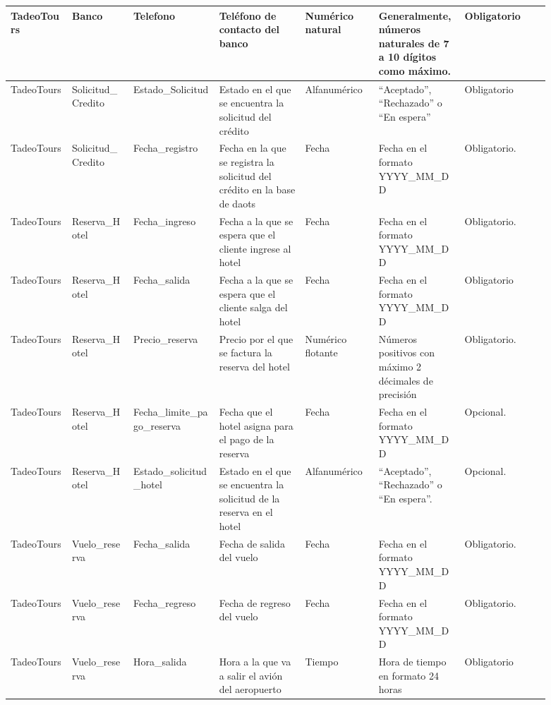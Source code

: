 \documentclass{article}
\begin{document}
\begin{landscape}
\begin{longtable}{|C{0.102\linewidth}|C{0.102\linewidth}|C{0.142\linewidth}|C{0.142\linewidth}|C{0.122\linewidth}|C{0.142\linewidth}|C{0.142\linewidth}|}
TadeoTours & Banco & Telefono & Teléfono de contacto del banco & Numérico natural & Generalmente, números naturales de 7 a 10 dígitos como máximo. & Obligatorio \\ \hline

TadeoTours & Solicitud\_Credito & Estado\_Solicitud & Estado en el que se encuentra la solicitud del crédito & Alfanumérico & ``Aceptado'', ``Rechazado'' o ``En espera'' & Obligatorio \\ \hline

TadeoTours & Solicitud\_Credito & Fecha\_registro & Fecha en la que se registra la solicitud del crédito en la base de daots & Fecha & Fecha en el formato YYYY\_MM\_DD & Obligatorio. \\ \hline

TadeoTours & Reserva\_Hotel & Fecha\_ingreso & Fecha a la que se espera que el cliente ingrese al hotel & Fecha & Fecha en el formato YYYY\_MM\_DD & Obligatorio. \\ \hline

TadeoTours & Reserva\_Hotel & Fecha\_salida & Fecha a la que se espera que el cliente salga del hotel & Fecha & Fecha en el formato YYYY\_MM\_DD & Obligatorio \\ \hline

TadeoTours & Reserva\_Hotel & Precio\_reserva & Precio por el que se factura la reserva del hotel & Numérico flotante & Números positivos con máximo 2 décimales de precisión & Obligatorio. \\ \hline

TadeoTours & Reserva\_Hotel & Fecha\_limite\_pago\_reserva & Fecha que el hotel asigna para el pago de la reserva & Fecha & Fecha en el formato YYYY\_MM\_DD & Opcional. \\ \hline

TadeoTours & Reserva\_Hotel & Estado\_solicitud\_hotel & Estado en el que se encuentra la solicitud de la reserva en el hotel & Alfanumérico & ``Aceptado'', ``Rechazado'' o ``En espera''. & Opcional. \\ \hline

TadeoTours & Vuelo\_reserva & Fecha\_salida & Fecha de salida del vuelo & Fecha & Fecha en el formato YYYY\_MM\_DD & Obligatorio. \\ \hline

TadeoTours & Vuelo\_reserva & Fecha\_regreso & Fecha de regreso del vuelo & Fecha & Fecha en el formato YYYY\_MM\_DD & Obligatorio. \\ \hline

TadeoTours & Vuelo\_reserva & Hora\_salida & Hora a la que va a salir el avión del aeropuerto & Tiempo & Hora de tiempo en formato 24 horas & Obligatorio \\ \hline


\end{longtable}
\end{landscape}
\end{document}
